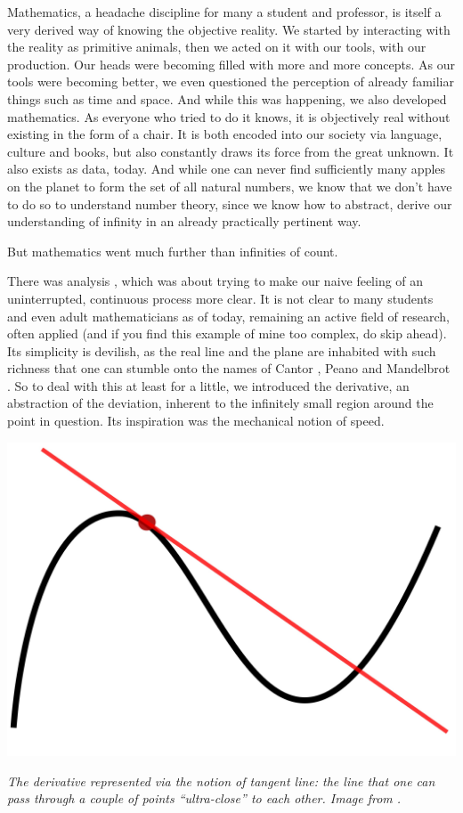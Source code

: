 \documentclass{article}
\begin{document}
Mathematics, a headache discipline for many a student and professor, is itself a very derived way of knowing the objective reality. We started by interacting with the reality as primitive animals, then we acted on it with our tools, with our production. Our heads were becoming filled with more and more concepts. As our tools were becoming better, we even questioned the perception of already familiar things such as time and space. And while this was happening, we also developed mathematics. As everyone who tried to do it knows, it is objectively real without existing in the form of a chair. It is both encoded into our society via language, culture and books, but also constantly draws its force from the great unknown. It also exists as data, today. And while one can never find sufficiently many apples on the planet to form the set of all natural numbers, we know that we don’t have to do so to understand number theory, since we know how to abstract, derive our understanding of infinity in an already practically pertinent way.

But mathematics went much further than infinities of count.

There was analysis \cite{ANALYSIS}, which was about trying to make our naive feeling of an uninterrupted, continuous process more clear. It is not clear to many students and even adult mathematicians as of today, remaining an active field of research, often applied (and if you find this example of mine too complex, do skip ahead). Its simplicity is devilish, as the real line and the plane are inhabited with such richness that one can stumble onto the names of Cantor \cite{CANTOR}, Peano \cite{PEANO} and Mandelbrot
\cite{MANDELBROT}. So to deal with this at least for a little, we introduced the derivative, an abstraction of the deviation, inherent to the infinitely small region around the point in question. Its inspiration was the mechanical notion of speed.

\begin{center}
\includegraphics[scale=0.05]{Tangent_to_a_curve.jpg}

\textit{The derivative represented via the notion of tangent line: the line that one can pass through a couple of points ``ultra-close'' to each other. Image from \cite{DERIVATIVE}.}
\end{center}
\end{document}

